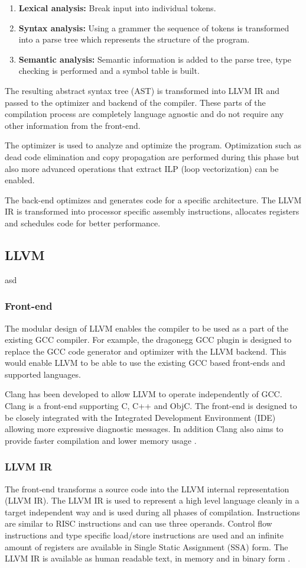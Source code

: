 \begin{enumerate}
	\item \textbf{Lexical analysis:} Break input into individual tokens.
	\item \textbf{Syntax analysis:} Using a grammer the sequence of tokens is transformed into a parse tree which represents the structure of the program.
	\item \textbf{Semantic analysis:} Semantic information is added to the parse tree, type checking is performed and a symbol table is built.
\end{enumerate}

The resulting abstract syntax tree (AST) is transformed into LLVM IR and passed to the optimizer and backend of the compiler. These parts of the compilation process are completely language agnostic and do not require any other information from the front-end.

The optimizer is used to analyze and optimize the program. Optimization such as dead code elimination and copy propagation are performed during this phase but also more advanced operations that extract ILP (loop vectorization) can be enabled.

The back-end optimizes and generates code for a specific architecture. The LLVM IR is transformed into processor specific assembly instructions, allocates registers and schedules code for better performance.

\subsection{LLVM}
asd
\subsubsection{Front-end}
The modular design of LLVM enables the compiler to be used as a part of the existing GCC compiler. For example, the dragonegg GCC plugin is designed to replace the GCC code generator and optimizer with the LLVM backend. This would enable LLVM to be able to use the existing GCC based front-ends and supported languages.

Clang has been developed to allow LLVM to operate independently of GCC. Clang is a front-end supporting C, C++ and ObjC. The front-end is designed to be closely integrated with the Integrated Development Environment (IDE) allowing more expressive diagnostic messages. In addition Clang also aims to provide faster compilation and lower memory usage \cite{clang:features}.
\subsubsection{LLVM IR}
The front-end transforms a source code into the LLVM internal representation (LLVM IR). The LLVM IR is used to represent a high level language cleanly in a target independent way and is used during all phases of compilation. Instructions are similar to RISC instructions and can use three operands. Control flow instructions and type specific load/store instructions are used and an infinite amount of registers are available in Single Static Assignment (SSA) form. The LLVM IR is available as human readable text, in memory and in binary form \cite{llvm:presentation}.

